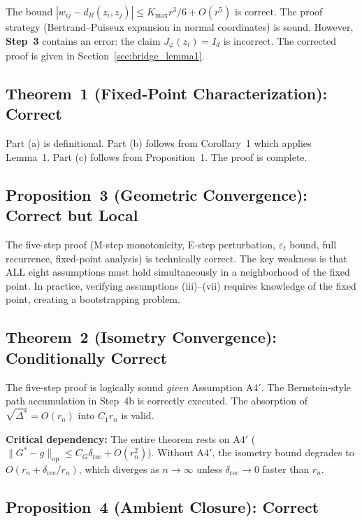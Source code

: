\documentclass{article}
\begin{document}
The bound $|w_{ij} - d_R(z_i, z_j)| \leq K_{\max} r^3/6 + O(r^5)$ is correct.
The proof strategy (Bertrand--Puiseux expansion in normal coordinates) is sound.
However, \textbf{Step~3} contains an error: the claim $J_\varphi(z_i) = I_d$
is incorrect. The corrected proof is given in Section~\ref{sec:bridge_lemma1}.

\subsection{Theorem~1 (Fixed-Point Characterization): Correct}

Part (a) is definitional. Part (b) follows from Corollary~1 which applies
Lemma~1. Part (c) follows from Proposition~1. The proof is complete.

\subsection{Proposition~3 (Geometric Convergence): Correct but Local}

The five-step proof (M-step monotonicity, E-step perturbation, $\varepsilon_t$
bound, full recurrence, fixed-point analysis) is technically correct.
The key weakness is that ALL eight assumptions must hold simultaneously in a
neighborhood of the fixed point. In practice, verifying assumptions (iii)--(vii)
requires knowledge of the fixed point, creating a bootstrapping problem.

\subsection{Theorem~2 (Isometry Convergence): Conditionally Correct}

The five-step proof is logically sound \textit{given} Assumption A4$'$.
The Bernstein-style path accumulation in Step~4b is correctly executed.
The absorption of $\sqrt{\Delta^*} = O(r_n)$ into $C_1 r_n$ is valid.

\textbf{Critical dependency:} The entire theorem rests on A4$'$
($\|G^* - g\|_{\mathrm{op}} \leq C_G \delta_{\mathrm{rec}} + O(r_n^2)$).
Without A4$'$, the isometry bound degrades to
$O(r_n + \delta_{\mathrm{rec}}/r_n)$, which diverges as $n \to \infty$
unless $\delta_{\mathrm{rec}} \to 0$ faster than $r_n$.

\subsection{Proposition~4 (Ambient Closure): Correct}
\end{document}
